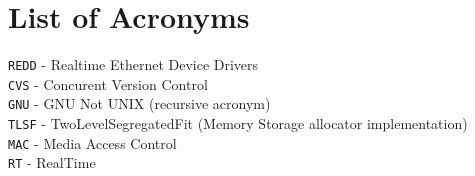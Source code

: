 
\section{List of Acronyms}
\noindent
{\tt REDD} - Realtime Ethernet Device Drivers\\
{\tt CVS} - Concurent Version Control\\
{\tt GNU} - GNU Not UNIX (recursive acronym)\\
{\tt TLSF} - TwoLevelSegregatedFit (Memory Storage allocator implementation) \\
{\tt MAC} - Media Access Control \\
{\tt RT} - RealTime\\

